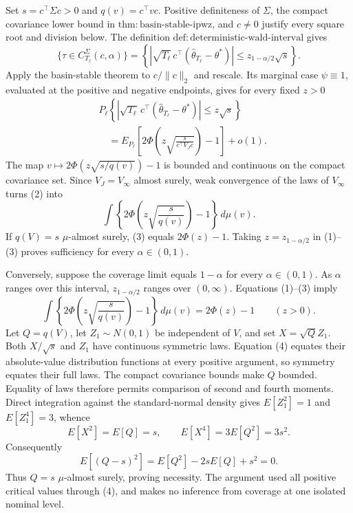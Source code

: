 Set \(s=c^\top\Sigma c>0\) and \(q(v)=c^\top vc\).  Positive definiteness
of \(\Sigma\), the compact covariance lower bound in
\(\mathrm{thm:basin\text{-}stable\text{-}ipwz}\), and \(c\ne0\) justify
every square root and division below.  The definition
\(\mathrm{def:deterministic\text{-}wald\text{-}interval}\) gives
\[
 \{\tau\in C_{T_\ell}^{\Sigma}(c,\alpha)\}
 =\left\{\left|\sqrt{T_\ell}\,c^\top
 (\widehat\theta_{T_\ell}-\theta^*)\right|
 \le z_{1-\alpha/2}\sqrt s\right\}.
\tag{1}
\]
Apply the basin-stable theorem to \(c/\|c\|_2\) and rescale.  Its marginal
case \(\psi\equiv1\), evaluated at the positive and negative endpoints,
gives for every fixed \(z>0\)
\[
 \begin{aligned}
 &P_\ell\!\left\{\left|\sqrt{T_\ell}\,c^\top
 (\widehat\theta_{T_\ell}-\theta^*)\right|\le z\sqrt s\right\}\\
 &\quad=E_{P_\ell}\!\left[
 2\Phi\!\left(z\sqrt{\frac{s}{c^\top V_Jc}}\right)-1\right]+o(1).
 \end{aligned}
\tag{2}
\]
The map \(v\mapsto2\Phi(z\sqrt{s/q(v)})-1\) is bounded and continuous on
the compact covariance set.  Since \(V_J=V_\infty\) almost surely, weak
convergence of the laws of \(V_\infty\) turns (2) into
\[
 \int\left\{2\Phi\!\left(z\sqrt{\frac{s}{q(v)}}\right)-1\right\}
 \,d\mu(v).
\tag{3}
\]
If \(q(V)=s\) \(\mu\)-almost surely, (3) equals \(2\Phi(z)-1\).  Taking
\(z=z_{1-\alpha/2}\) in (1)--(3) proves sufficiency for every
\(\alpha\in(0,1)\).

Conversely, suppose the coverage limit equals \(1-\alpha\) for every
\(\alpha\in(0,1)\).  As \(\alpha\) ranges over this interval,
\(z_{1-\alpha/2}\) ranges over \((0,\infty)\).  Equations (1)--(3) imply
\[
 \int\left\{2\Phi\!\left(z\sqrt{\frac{s}{q(v)}}\right)-1\right\}
 \,d\mu(v)=2\Phi(z)-1
 \qquad(z>0).
\tag{4}
\]
Let \(Q=q(V)\), let \(Z_1\sim N(0,1)\) be independent of \(V\), and set
\(X=\sqrt QZ_1\).  Both \(X/\sqrt s\) and \(Z_1\) have continuous
symmetric laws.  Equation (4) equates their absolute-value distribution
functions at every positive argument, so symmetry equates their full laws.
The compact covariance bounds make \(Q\) bounded.  Equality of laws
therefore permits comparison of second and fourth moments.  Direct
integration against the standard-normal density gives
\(E[Z_1^2]=1\) and \(E[Z_1^4]=3\), whence
\[
 E[X^2]=E[Q]=s,
 \qquad E[X^4]=3E[Q^2]=3s^2.
\tag{5}
\]
Consequently
\[
 E[(Q-s)^2]=E[Q^2]-2sE[Q]+s^2=0.
\tag{6}
\]
Thus \(Q=s\) \(\mu\)-almost surely, proving necessity.  The argument used
all positive critical values through (4), and makes no inference from
coverage at one isolated nominal level.